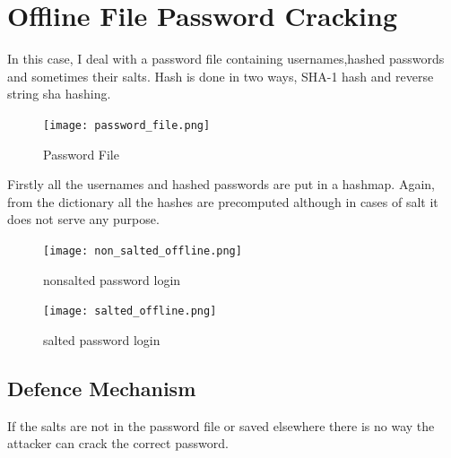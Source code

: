 \documentclass[11pt, english]{article}
\begin{document}
\section{Offline File Password Cracking}
In this case, I deal with a password file containing usernames,hashed passwords and sometimes their salts.
Hash is done in two ways, SHA-1 hash and reverse string sha hashing.\\
\begin{figure}[h!]
        \begin{minipage}[b]{1\linewidth}
        \centering
        \texttt{[image: password\_file.png]} \label{file}
        \caption{Password File}
        \end{minipage}
\end{figure}
Firstly all the usernames and hashed passwords are put in a hashmap. Again, from the dictionary all the hashes are precomputed although in cases of salt it does not serve any purpose.\\
\newpage
\begin{figure}[h!]
        \begin{minipage}[b]{1\linewidth}
        \centering
        \texttt{[image: non\_salted\_offline.png]} 
        \label{non_salted_login}
        \caption{nonsalted password login}
        \end{minipage}
\end{figure}
\begin{figure}[h!]
        \begin{minipage}[b]{1\linewidth}
        \centering
        \texttt{[image: salted\_offline.png]} \label{salted login}
        \caption{salted password login}
        \end{minipage}
\end{figure}
\subsection{Defence Mechanism}
If the salts are not in the password file or saved elsewhere there is no way the attacker can crack the correct password.\\
\end{document}
